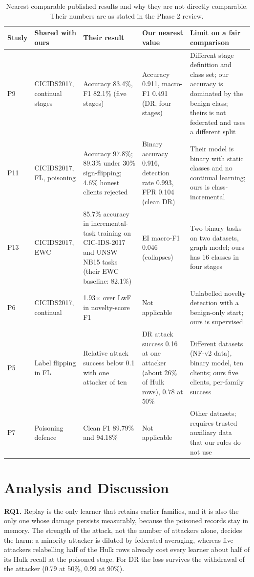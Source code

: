 \documentclass[10pt,a4paper]{article}
\begin{document}
\begin{table}[htbp]
\centering\footnotesize
\caption{Nearest comparable published results and why they are not directly comparable. Their numbers are as stated in the Phase 2 review.}
\label{tab:fair}
\begin{tabularx}{\linewidth}{L{1.5cm}L{2.2cm}L{3.3cm}L{3.0cm}Y}
\toprule
Study & Shared with ours & Their result & Our nearest value & Limit on a fair comparison\\
\midrule
P9 \cite{guo} & CICIDS2017, continual stages & Accuracy 83.4\%, F1 82.1\% (five stages) & Accuracy 0.911, macro-F1 0.491 (DR, four stages) & Different stage definition and class set; our accuracy is dominated by the benign class; theirs is not federated and uses a different split\\
P11 \cite{flzt} & CICIDS2017, FL, poisoning & Accuracy 97.8\%; 89.3\% under 30\% sign-flipping; 4.6\% honest clients rejected & Binary accuracy 0.916, detection rate 0.993, FPR 0.104 (clean DR) & Their model is binary with static classes and no continual learning; ours is class-incremental\\
P13 \cite{elgnn} & CICIDS2017, EWC & 85.7\% accuracy in incremental-task training on CIC-IDS-2017 and UNSW-NB15 tasks (their EWC baseline: 82.1\%) & EI macro-F1 0.046 (collapses) & Two binary tasks on two datasets, graph model; ours has 16 classes in four stages\\
P6 \cite{cnd} & CICIDS2017, continual & 1.93$\times$ over LwF in novelty-score F1 & Not applicable & Unlabelled novelty detection with a benign-only start; ours is supervised\\
P5 \cite{lavaur} & Label flipping in FL & Relative attack success below 0.1 with one attacker of ten & DR attack success 0.16 at one attacker (about 26\% of Hulk rows), 0.78 at 50\% & Different datasets (NF-v2 data), binary model, ten clients; ours five clients, per-family success\\
P7 \cite{wei} & Poisoning defence & Clean F1 89.79\% and 94.18\% & Not applicable & Other datasets; requires trusted auxiliary data that our rules do not use\\
\bottomrule
\end{tabularx}
\end{table}

\section{Analysis and Discussion}\label{sec:disc}
\textbf{RQ1.} Replay is the only learner that retains earlier families, and it is also the only one whose damage persists measurably, because the poisoned records stay in memory. The strength of the attack, not the number of attackers alone, decides the harm: a minority attacker is diluted by federated averaging, whereas five attackers relabelling half of the Hulk rows already cost every learner about half of its Hulk recall at the poisoned stage. For DR the loss survives the withdrawal of the attacker (0.79 at 50\%, 0.99 at 90\%).
\end{document}
